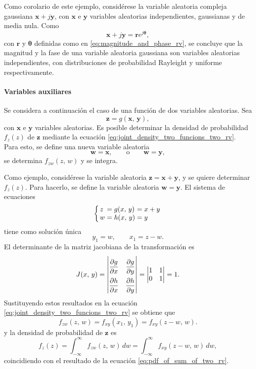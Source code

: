\documentclass[a4paper]{report}
\newcommand{\x}{\mathbf{x}}
\newcommand{\y}{\mathbf{y}}
\newcommand{\w}{\mathbf{w}}
\newcommand{\z}{\mathbf{z}}
\begin{document}
Como corolario de este ejemplo, considérese la variable aleatoria compleja gaussiana \(\x+j\y\), con \(\x\) e \(\y\) variables aleatorias independientes, gaussianas y de media nula. Como
\[
 \x+j\y=\mathbf{r}e^{j\bm{\theta}},
\]
con \(\mathbf{r}\) y \(\bm{\theta}\) definidas como en \ref{eq:magnitude_and_phase_rv}, se concluye que la magnitud y la fase de una variable aleatoria gaussiana son variables aleatorias independientes, con distribuciones de probabilidad Rayleight y uniforme respectivamente.

\paragraph{Variables auxiliares} Se considera a continuación el caso de una función de dos variables aleatorias. Sea
\[
 \z=g(\x,\,\y),
\]
con \(\x\) e \(\y\) variables aleatorias. Es posible determinar la densidad de probabilidad \(f_z(z)\) de \(\z\) mediante la ecuación \ref{eq:joint_density_two_funcions_two_rv}. Para esto, se define una nueva variable aleatoria
\[
 \w=\x,\qquad\textrm{o}\qquad \w=\y,
\]
se determina \(f_{zw}(z,\,w)\) y se integra.

Como ejemplo, considérese la variable aleatoria \(\z=\x+\y\), y se quiere determinar \(f_z(z)\). Para hacerlo, se define la variable aleatoria \(\w=\y\).
El sistema de ecuaciones
\[
\arraycolsep=1.4pt
 \left\{
 \begin{array}{lllll}
  z&=&g(x,\,y)&=&x+y\\
  w&=&h(x,\,y)&=&y
 \end{array} \right.
\]
tiene como solución única
\[
 y_1=w,\qquad x_1=z-w.
\]
El determinante de la matriz jacobiana de la transformación es
\[
\def\arraystretch{2.2}
 J(x,\,y)=
\begin{vmatrix}
   \dfrac{\partial g}{\partial x} & \dfrac{\partial g}{\partial y} \\
   \dfrac{\partial h}{\partial x} & \dfrac{\partial h}{\partial y}
\end{vmatrix}
=
\def\arraystretch{1}
\begin{vmatrix}
   1 & 1 \\
   0 & 1
\end{vmatrix}
=1.
\]
Sustituyendo estos resultados en la ecuación \ref{eq:joint_density_two_funcions_two_rv} se obtiene que
\[
 f_{zw}(z,\,w)=f_{xy}(x_1,\,y_1)=f_{xy}(z-w,\,w).
\]
y la densidad de probabilidad de \(\z\) es
\[
 f_z(z)=\int_{-\infty}^{\infty}f_{zw}(z,\,w)\,dw=\int_{-\infty}^{\infty}f_{xy}(z-w,\,w)\,dw,
\]
coincidiendo con el resultado de la ecuación \ref{eq:pdf_of_sum_of_two_rv}.
\end{document}
